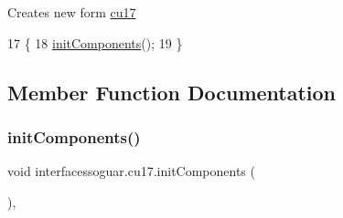 Creates new form \mbox{\hyperlink{classinterfacessoguar_1_1cu17}{cu17}} 
\begin{DoxyCode}
17                   \{
18         \mbox{\hyperlink{classinterfacessoguar_1_1cu17_a3aaa3b6f470aaa30b091048b247262b1}{initComponents}}();
19     \}
\end{DoxyCode}


\subsection{Member Function Documentation}
\mbox{\label{classinterfacessoguar_1_1cu17_a3aaa3b6f470aaa30b091048b247262b1}} 
\subsubsection{\texorpdfstring{init\+Components()}{initComponents()}}
{\footnotesize\ttfamily void interfacessoguar.\+cu17.\+init\+Components (\begin{DoxyParamCaption}{ }\end{DoxyParamCaption})\hspace{0.3cm}{\ttfamily [inline]}, {\ttfamily [private]}}


